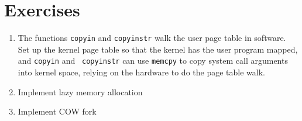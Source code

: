 \section{Exercises}

\begin{enumerate}

\item The functions {\tt copyin} and {\tt copyinstr} walk the user
  page table in software.  Set up the kernel page table so that the
  kernel has the user program mapped, and {\tt copyin} and {\tt
    copyinstr} can use {\tt memcpy} to copy system call arguments into
  kernel space, relying on the hardware to do the page table walk.

\item Implement lazy memory allocation

\item Implement COW fork

\end{enumerate}
